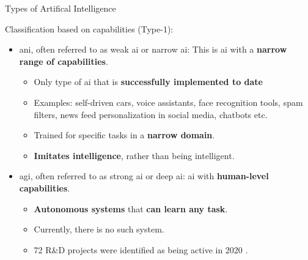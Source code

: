 
%
%
%

\begin{frame}{Types of Artifical Intelligence}

    Classification based on capabilities (Type-1):\\
    \vspace{0.1cm}

    \begin{itemize}

        \item 
        \gls{ani}, often referred to as 
        \Gls{weak ai} or
        \Gls{narrow ai}:
        This is \gls{ai} 
        with a {\bf narrow range of capabilities}.\\

        \vspace{0.1cm}

        \begin{itemize}
            \item 
            Only type of \gls{ai} that is {\bf successfully implemented to date}
            \item
            Examples: 
            self-driven cars, voice assistants, 
            face recognition tools, spam filters,
            news feed personalization in social media, 
            chatbots etc.
            \item 
            Trained for specific tasks in a {\bf narrow domain}.   
            \item 
            {\bf Imitates intelligence}, rather than being intelligent.\\
        \end{itemize}

        \vspace{0.1cm}

        \item 
        \gls{agi}, often referred to as 
        \Gls{strong ai} or
        \Gls{deep ai}:
        \gls{ai} with {\bf human-level capabilities}.\\

        \vspace{0.1cm}

        \begin{itemize}
            \item 
            {\bf Autonomous systems} that {\bf can learn any task}.
            \item 
            Currently, there is no such system.
            \item
            72  R\&D projects were identified as being active in 2020 \cite{GCRI:2020agi}.
        \end{itemize}



\end{itemize}
\end{frame}
